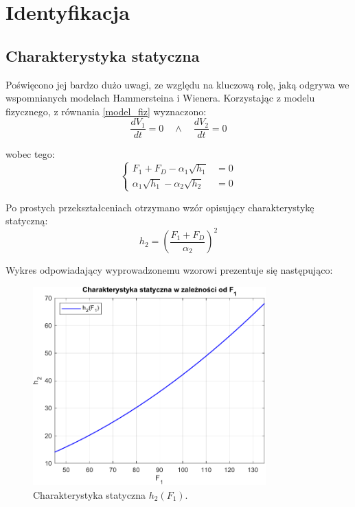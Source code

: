 \chapter{Identyfikacja}
\section{Charakterystyka statyczna}
Poświęcono jej bardzo dużo uwagi, ze względu na kluczową rolę, jaką odgrywa we wspomnianych modelach Hammersteina i Wienera. Korzystając z modelu fizycznego, z równania \ref{model_fiz} wyznaczono:
\begin{equation}
\frac{dV_1}{dt} = 0 \quad \wedge \quad \frac{dV_2}{dt} = 0
\end{equation}

\noindent wobec tego:
\begin{equation}
\begin{cases}
F_1 + F_D - \alpha_1 \sqrt{h_1} &= 0 \\
\alpha_1 \sqrt{h_1} - \alpha_2 \sqrt{h_2} &= 0
\end{cases}
\end{equation}

\noindent Po prostych przekształceniach otrzymano wzór opisujący charakterystykę statyczną:
\begin{equation}
h_2 = \left( \frac{F_1 + F_D}{\alpha_2} \right)^2
\end{equation}

\noindent Wykres odpowiadający wyprowadzonemu wzorowi prezentuje się następująco:

\begin{figure}[h!]
\centering
\includegraphics[width=0.8\textwidth]{pictures/static_characteristic}
\caption{Charakterystyka statyczna $h_2(F_1)$.}
\label{static_characteristic}
\end{figure}

